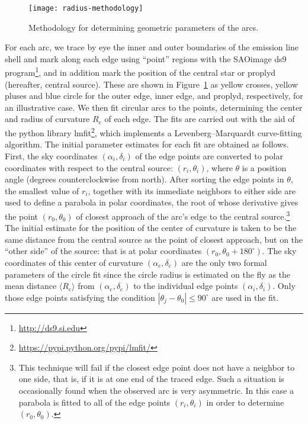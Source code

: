 \documentclass[iop, apj]{emulateapj}
\begin{document}
\newcommand\Rc{\ensuremath{R_{\mathrm{c}}}}
\begin{figure}
  \texttt{[image: radius-methodology]}
  \caption{Methodology for determining geometric parameters of the arcs.}
  \label{fig:r0-rc-method}
\end{figure}
For each arc, we trace by eye the inner and outer boundaries of the emission line shell and mark along each edge using ``point'' regions with the SAOimage ds9 program\footnote{\url{http://ds9.si.edu}}, and in addition mark the position of the central star or proplyd (hereafter, central source).  These are shown in Figure~\ref{fig:r0-rc-method} as yellow crosses, yellow pluses and blue circle for the outer edge, inner edge, and proplyd, respectively, for an illustrative case. We then fit circular arcs to the points, determining the center and radius of curvature \(\Rc\) of each edge.  The fits are carried out with the aid of the python library lmfit\footnote{\url{https://pypi.python.org/pypi/lmfit/}}, which implements a Levenberg--Marquardt curve-fitting algorithm.  The initial parameter estimates for each fit are obtained as follows. First, the sky coordinates \((\alpha_i, \delta_i)\) of the edge points are converted to polar coordinates with respect to the central source: \((r_i, \theta_i)\), where \(\theta\) is a position angle (degrees counterclockwise from north).   After sorting the edge points in \(\theta\), the smallest value of \(r_i\), together with its immediate neighbors to either side are used to define a parabola in polar coordinates, the root of whose derivative gives the point \((r_0, \theta_0)\) of closest approach of the arc's edge to the central source.\footnote{This technique will fail if the closest edge point does not have a neighbor to one side, that is, if it is at one end of the traced edge. Such a situation is occasionally found when the observed arc is very asymmetric. In this case a parabola is fitted to all of the edge points \((r_i, \theta_i)\) in order to determine \((r_0, \theta_0)\).}  The initial estimate for the position of the center of curvature is taken to be the same distance from the central source as the point of closest approach, but on the ``other side'' of the source: that is at polar coordinates \((r_0, \theta_0 + 180^{\circ})\).  The sky coordinates of this center of curvature \((\alpha_{\mathrm{c}}, \delta_{\mathrm{c}})\) are the only two formal parameters of the circle fit since the circle radius is estimated on the fly as the mean distance \(\langle\Rc\rangle\) from  \((\alpha_{\mathrm{c}}, \delta_{\mathrm{c}})\) to the individual edge points \((\alpha_i, \delta_i)\).   Only those edge points satisfying the condition \(|\theta_j - \theta_0| \le 90^\circ\) are used in the fit.
\end{document}
